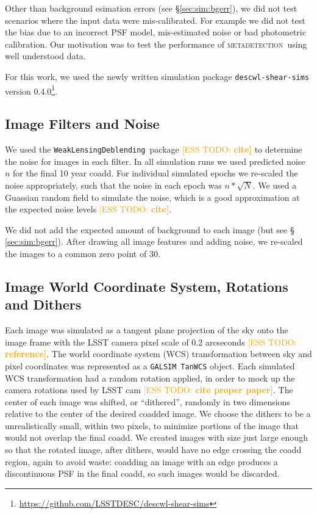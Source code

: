 \documentclass[iop, twocolappendix, appendixfloats, numberedappendix, apj]{hackemulateapj}
\newcommand{\esstodo}[1]{\textcolor{orange}{[ESS TODO: \bf #1]}}
\newcommand{\descwl}{\texttt{WeakLensingDeblending}}
\newcommand{\galsim}{\texttt{GALSIM}}
\newcommand{\mdet}{\textsc{metadetection}}
\begin{document}
Other than background esimation errors (see \S \ref{sec:sim:bgerr}), we did not
test scenarios where the input data were mis-calibrated.  For example we did
not test the bias due to an incorrect PSF model, mis-estimated noise or bad
photometric calibration.  Our motivation was to test the performance of \mdet\
using well understood data.

For this work, we used the newly written simulation package
\texttt{descwl-shear-sims} version
0.4.0\footnote{\url{https://github.com/LSSTDESC/descwl-shear-sims}}.

\subsection{Image Filters and Noise} \label{sec:sim:noise}

We used the \descwl\ package \esstodo{cite} to determine the
noise for images in each filter.  In all simulation runs we used predicted
noise $n$ for the final 10 year coadd.  For individual simulated epochs we
re-scaled the noise appropriately, such that the noise in each epoch was $n *
\sqrt{N}$.  We used a Guassian random field to simulate the noise, which is a
good approximation at the expected noise levels \esstodo{cite}.

We did not add the expected amount of background to each image (but see \S
\ref{sec:sim:bgerr}).  After drawing all image features and adding
noise, we re-scaled the images to a common zero point of 30.

\subsection{Image World Coordinate System, Rotations and Dithers} \label{sec:sim:rotdith}

Each image was simulated as a tangent plane projection of the sky onto the
image frame with the LSST camera pixel scale of 0.2 arcseconds \esstodo{reference}.
The world coordinate system (WCS) transformation between sky and pixel
coordinates was represented as a \galsim\ \texttt{TanWCS} object.  Each
simulated WCS transformation had a random rotation applied, in order to mock up
the camera rotations used by LSST cam \esstodo{cite proper paper}.  The center of
each image was shifted, or ``dithered'', randomly in two dimensions relative to
the center of the desired coadded image.  We choose the dithers to be a
unrealistically small, within two pixels, to minimize portions of the image
that would not overlap the final coadd.  We created images with size just large enough
so that the rotated image, after dithers, would have no edge crossing the coadd
region, again to avoid waste:  coadding an image with an edge produces a
discontinuous PSF in the final coadd, so such images would be discarded.
\end{document}

